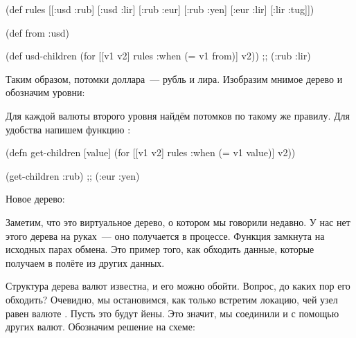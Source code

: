 \begin{english}
  \begin{clojure}
(def rules
  [[:usd :rub]
   [:usd :lir]
   [:rub :eur]
   [:rub :yen]
   [:eur :lir]
   [:lir :tug]])

(def from :usd)

(def usd-children
  (for [[v1 v2] rules
        :when (= v1 from)]
    v2))
;; (:rub :lir)
  \end{clojure}
\end{english}

Таким образом, потомки доллара~--- рубль и лира. Изобразим мнимое дерево и
обозначим уровни:


Для каждой валюты второго уровня найдём потомков по такому же правилу. Для
удобства напишем функцию :

\begin{english}
  \begin{clojure}
(defn get-children [value]
  (for [[v1 v2] rules
        :when (= v1 value)]
    v2))

(get-children :rub)
;; (:eur :yen)
  \end{clojure}
\end{english}

Новое дерево:


Заметим, что это виртуальное дерево, о котором мы говорили недавно. У нас нет
этого дерева на руках~--- оно получается в процессе. Функция 
замкнута на исходных парах обмена. Это пример того, как обходить данные, которые
получаем в полёте из других данных.

Структура дерева валют известна, и его можно обойти. Вопрос, до каких пор его
обходить? Очевидно, мы остановимся, как только встретим локацию, чей узел равен
валюте . Пусть это будут йены. Это значит, мы соединили  и  с
помощью других валют. Обозначим решение на схеме:


